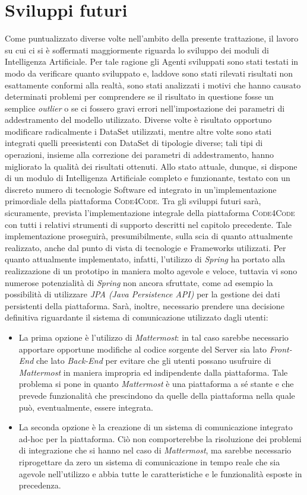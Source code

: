 \section{Sviluppi futuri}
Come puntualizzato diverse volte nell'ambito della presente trattazione, il lavoro su cui ci si è soffermati maggiormente riguarda lo sviluppo dei moduli di Intelligenza Artificiale. Per tale ragione gli Agenti sviluppati sono stati testati in modo da verificare quanto sviluppato e, laddove sono stati rilevati risultati non esattamente conformi alla realtà, sono stati analizzati i motivi che hanno causato determinati problemi per comprendere se il risultato in questione fosse un semplice \emph{outlier} o se ci fossero gravi errori nell'impostazione dei parametri di addestramento del modello utilizzato. Diverse volte è risultato opportuno modificare radicalmente i DataSet utilizzati, mentre altre volte sono stati integrati quelli preesistenti con DataSet di tipologie diverse; tali tipi di operazioni, insieme alla correzione dei parametri di addestramento, hanno migliorato la qualità dei risultati ottenuti. Allo stato attuale, dunque, si dispone di un modulo di Intelligenza Artificiale completo e funzionante, testato con un discreto numero di tecnologie Software ed integrato in un'implementazione primordiale della piattaforma \textsc{Code4Code}. Tra gli sviluppi futuri sarà, sicuramente, prevista l'implementazione integrale della piattaforma \textsc{Code4Code} con tutti i relativi strumenti di supporto descritti nel capitolo precedente. Tale implementazione proseguirà, presumibilmente, sulla scia di quanto attualmente realizzato, anche dal punto di vista di tecnologie e Frameworks utilizzati. Per quanto attualmente implementato, infatti, l'utilizzo di \emph{Spring} ha portato alla realizzazione di un prototipo in maniera molto agevole e veloce, tuttavia vi sono numerose potenzialità di \emph{Spring} non ancora sfruttate, come ad esempio la possibilità di utilizzare \emph{JPA (Java Persistence API)} \cite{jpa} per la gestione dei dati persistenti della piattaforma. Sarà, inoltre, necessario prendere una decisione definitiva riguardante il sistema di comunicazione utilizzato dagli utenti: 
\begin{itemize}
	\item La prima opzione è l'utilizzo di \emph{Mattermost}: in tal caso sarebbe necessario apportare opportune modifiche al codice sorgente del Server sia lato \emph{Front-End} che lato \emph{Back-End} per evitare che gli utenti possano usufruire di \emph{Mattermost} in maniera impropria ed indipendente dalla piattaforma. Tale problema si pone in quanto \emph{Mattermost} è una piattaforma a sé stante e che prevede funzionalità che prescindono da quelle della piattaforma nella quale può, eventualmente, essere integrata. 
	\item La seconda opzione è la creazione di un sistema di comunicazione integrato ad-hoc per la piattaforma. Ciò non comporterebbe la risoluzione dei problemi di integrazione che si hanno nel caso di \emph{Mattermost}, ma sarebbe necessario riprogettare da zero un sistema di comunicazione in tempo reale che sia agevole nell'utilizzo e abbia tutte le caratteristiche e le funzionalità esposte in precedenza.
\end{itemize}
